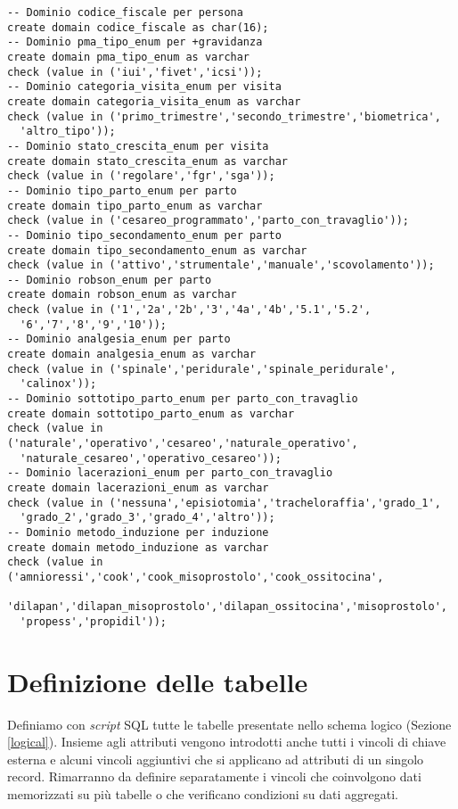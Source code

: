 \begin{lstlisting}[float,caption={Definizione dei domini.},label=pdom]
-- Dominio codice_fiscale per persona
create domain codice_fiscale as char(16);
-- Dominio pma_tipo_enum per +gravidanza
create domain pma_tipo_enum as varchar
check (value in ('iui','fivet','icsi'));
-- Dominio categoria_visita_enum per visita
create domain categoria_visita_enum as varchar
check (value in ('primo_trimestre','secondo_trimestre','biometrica',
  'altro_tipo'));
-- Dominio stato_crescita_enum per visita
create domain stato_crescita_enum as varchar
check (value in ('regolare','fgr','sga'));
-- Dominio tipo_parto_enum per parto
create domain tipo_parto_enum as varchar
check (value in ('cesareo_programmato','parto_con_travaglio'));
-- Dominio tipo_secondamento_enum per parto
create domain tipo_secondamento_enum as varchar
check (value in ('attivo','strumentale','manuale','scovolamento'));
-- Dominio robson_enum per parto
create domain robson_enum as varchar
check (value in ('1','2a','2b','3','4a','4b','5.1','5.2',
  '6','7','8','9','10'));
-- Dominio analgesia_enum per parto
create domain analgesia_enum as varchar
check (value in ('spinale','peridurale','spinale_peridurale',
  'calinox'));
-- Dominio sottotipo_parto_enum per parto_con_travaglio
create domain sottotipo_parto_enum as varchar
check (value in ('naturale','operativo','cesareo','naturale_operativo',
  'naturale_cesareo','operativo_cesareo'));
-- Dominio lacerazioni_enum per parto_con_travaglio
create domain lacerazioni_enum as varchar
check (value in ('nessuna','episiotomia','tracheloraffia','grado_1',
  'grado_2','grado_3','grado_4','altro'));
-- Dominio metodo_induzione per induzione
create domain metodo_induzione as varchar
check (value in ('amnioressi','cook','cook_misoprostolo','cook_ossitocina',
  'dilapan','dilapan_misoprostolo','dilapan_ossitocina','misoprostolo',
  'propess','propidil'));
\end{lstlisting}

\FloatBarrier

\section{Definizione delle tabelle}

Definiamo con \emph{script} SQL tutte le tabelle presentate nello schema logico (Sezione \ref{logical}).
Insieme agli attributi vengono introdotti anche tutti i vincoli di chiave esterna e alcuni vincoli aggiuntivi che si applicano ad attributi di un singolo record.
Rimarranno da definire separatamente i vincoli che coinvolgono dati memorizzati su più tabelle o che verificano condizioni su dati aggregati.

